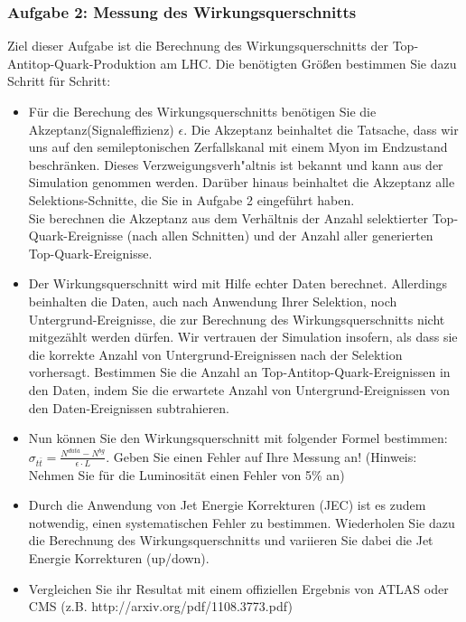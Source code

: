 \subsubsection{Aufgabe 2: Messung des Wirkungsquerschnitts}
Ziel dieser Aufgabe ist die Berechnung des Wirkungsquerschnitts der Top-Antitop-Quark-Produktion am LHC. Die ben\"otigten Gr\"o\ss{}en bestimmen Sie dazu Schritt f\"ur Schritt:
\begin{itemize}
	\item F\"ur die Berechung des Wirkungsquerschnitts ben\"otigen Sie die Akzeptanz(Signaleffizienz) $\epsilon$. Die Akzeptanz beinhaltet die Tatsache, dass wir uns auf den semileptonischen Zerfalls\-kanal mit einem Myon im Endzustand beschr\"anken. Dieses Verzweigungsverh"altnis ist bekannt und kann aus der Simulation genommen werden. Dar\"uber hinaus beinhaltet die Akzeptanz alle Selektions-Schnitte, die Sie in Aufgabe 2 eingef\"uhrt haben. \\Sie berechnen die Akzeptanz aus dem Verh\"altnis der Anzahl selektierter Top-Quark-Ereignisse (nach allen Schnitten) und der Anzahl aller generierten Top-Quark-Er\-eig\-nisse.
	\item Der Wirkungsquerschnitt wird mit Hilfe echter Daten berechnet. Allerdings beinhalten die Daten, auch nach Anwendung Ihrer Selektion, noch Untergrund-Ereignisse, die zur Berechnung des Wirkungsquerschnitts nicht mitgez\"ahlt werden d\"urfen. Wir vertrauen der Simulation insofern, als dass sie die korrekte Anzahl von Untergrund-Ereignissen nach der Selektion vorhersagt. Bestimmen Sie die Anzahl an Top-Antitop-Quark-Ereignissen in den Daten, indem Sie die erwartete Anzahl von Untergrund-Ereignissen von den Daten-Ereignissen subtrahieren.
	\item Nun k\"onnen Sie den Wirkungsquerschnitt mit folgender Formel bestimmen: $\sigma_{t\bar{t}} = \frac{N^{data} - N^{bg}}{\epsilon \cdot L}$. Geben Sie einen Fehler auf Ihre Messung an! (Hinweis: Nehmen Sie f\"ur die Luminosit\"at einen Fehler von 5\% an)
        \item Durch die Anwendung von Jet Energie Korrekturen (JEC) ist es zudem notwendig, einen systematischen Fehler zu bestimmen. Wiederholen Sie dazu die Berechnung des Wirkungsquerschnitts und variieren Sie dabei die Jet Energie Korrekturen (up/down). 
	\item Vergleichen Sie ihr Resultat mit einem offiziellen Ergebnis von ATLAS oder CMS (z.B. http://arxiv.org/pdf/1108.3773.pdf)
\end{itemize}

